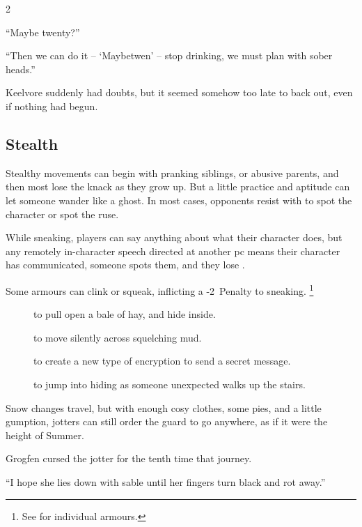 \begin{multicols}{2}
\begin{exampletext}
  ``Maybe twenty?''

  ``Then we can do it -- `Maybetwen' -- stop drinking, we must plan with sober heads.''

  Keelvore suddenly had doubts, but it seemed somehow too late to back out, even if nothing had begun.
\end{exampletext}

\subsection{Stealth}

Stealthy movements can begin with pranking siblings, or abusive parents, and then most lose the knack as they grow up.
But a little practice and aptitude can let someone wander like a ghost.
In most cases, opponents resist with  to spot the character or spot the ruse.

While sneaking, players can say anything about what their character does, but any remotely in-character speech directed at another \gls{pc} means their character has communicated, someone spots them, and they lose .

Some \glspl{armour} can clink or squeak, inflicting a -2~Penalty to sneaking.%
\footnote{See  for individual \glspl{armour}.}

\begin{description}
  \item[]
    to pull open a bale of hay, and hide inside.
  \item[]
    to move silently across squelching mud.
  \item[]
    to create a new type of encryption to send a secret message.
  \item[]
    to jump into hiding as someone unexpected walks up the stairs.
\end{description}

\begin{exampletext}
  Snow changes travel, but with enough cosy clothes, some pies, and a little gumption, \glspl{jotter} can still order the \gls{guard} to go anywhere, as if it were the height of Summer.

  Grogfen cursed the \gls{jotter} for the tenth time that journey.

  ``I hope she lies down with \gls{sable} until her fingers turn black and rot away.''


\end{exampletext}
\end{multicols}
